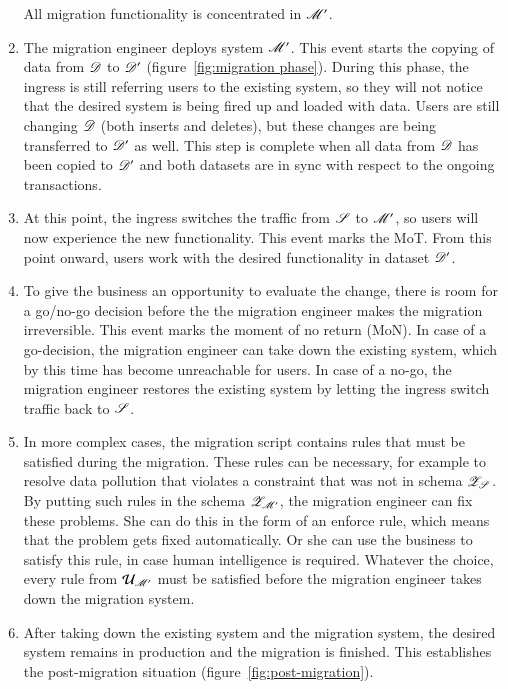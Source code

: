 \documentclass{elsarticle}
\begin{document}
\begin{enumerate}
         All migration functionality is concentrated in $\mathscr{M}'$.
   \item The migration engineer deploys system $\mathscr{M}'$.
         This event starts the copying of data from $\mathscr{D}$ to $\mathscr{D}'$ (figure~\ref{fig:migration phase}).
         During this phase, the ingress is still referring users to the existing system,
         so they will not notice that the desired system is being fired up and loaded with data.
         Users are still changing $\mathscr{D}$ (both inserts and deletes),
         but these changes are being transferred to $\mathscr{D}'$ as well.
         This step is complete when all data from $\mathscr{D}$ has been copied to $\mathscr{D}'$ and
         both datasets are in sync with respect to the ongoing transactions.
   \item At this point, the ingress switches the traffic from $\mathscr{S}$ to $\mathscr{M}'$,
         so users will now experience the new functionality.
         This event marks the MoT.
         From this point onward, users work with the desired functionality in dataset $\mathscr{D}'$.
   \item To give the business an opportunity to evaluate the change,
         there is room for a go/no-go decision before the the migration engineer makes the migration irreversible.
         This event marks the moment of no return (MoN).
         In case of a go-decision, the migration engineer can take down the existing system, which by this time has become unreachable for users.
         In case of a no-go, the migration engineer restores the existing system by letting the ingress switch traffic back to $\mathscr{S}$.
   \item In more complex cases, the migration script contains rules that must be satisfied during the migration.
         These rules can be necessary, for example to resolve data pollution that violates a constraint that was not in schema $\mathscr{Z}_{\mathscr{S}}$.
         By putting such rules in the schema $\mathscr{Z}_{\mathscr{M}'}$,
         the migration engineer can fix these problems.
         She can do this in the form of an enforce rule, which means that the problem gets fixed automatically.
         Or she can use the business to satisfy this rule, in case human intelligence is required.
         Whatever the choice, every rule from $\mathcal{U}_{\mathscr{M}'}$ must be satisfied before the migration engineer takes down the migration system.
   \item After taking down the existing system and the migration system, the desired system remains in production and the migration is finished.
         This establishes the post-migration situation (figure~\ref{fig:post-migration}).
\end{enumerate}
\end{document}
